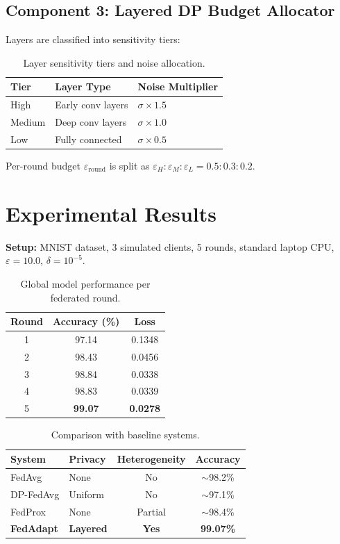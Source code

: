 \documentclass[10pt,twocolumn]{article}
\begin{document}
\subsection{Component 3: Layered DP Budget Allocator}
Layers are classified into sensitivity tiers:

\begin{table}[h]
\centering
\begin{tabular}{lll}
\toprule
Tier & Layer Type & Noise Multiplier \\
\midrule
High & Early conv layers & $\sigma \times 1.5$ \\
Medium & Deep conv layers & $\sigma \times 1.0$ \\
Low & Fully connected & $\sigma \times 0.5$ \\
\bottomrule
\end{tabular}
\caption{Layer sensitivity tiers and noise allocation.}
\end{table}

Per-round budget $\varepsilon_{\text{round}}$ is split as
$\varepsilon_H : \varepsilon_M : \varepsilon_L = 0.5 : 0.3 : 0.2$.

\section{Experimental Results}

\textbf{Setup:} MNIST dataset, 3 simulated clients, 5 rounds,
standard laptop CPU, $\varepsilon=10.0$, $\delta=10^{-5}$.

\begin{table}[h]
\centering
\begin{tabular}{ccc}
\toprule
Round & Accuracy (\%) & Loss \\
\midrule
1 & 97.14 & 0.1348 \\
2 & 98.43 & 0.0456 \\
3 & 98.84 & 0.0338 \\
4 & 98.83 & 0.0339 \\
5 & \textbf{99.07} & \textbf{0.0278} \\
\bottomrule
\end{tabular}
\caption{Global model performance per federated round.}
\end{table}

\begin{table}[h]
\centering
\begin{tabular}{llcc}
\toprule
System & Privacy & Heterogeneity & Accuracy \\
\midrule
FedAvg & None & No & $\sim$98.2\% \\
DP-FedAvg & Uniform & No & $\sim$97.1\% \\
FedProx & None & Partial & $\sim$98.4\% \\
\textbf{FedAdapt} & \textbf{Layered} & \textbf{Yes} & \textbf{99.07\%} \\
\bottomrule
\end{tabular}
\caption{Comparison with baseline systems.}
\end{table}
\end{document}

